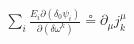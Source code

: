 \documentclass[preview]{standalone}
\begin{document}
\begin{align*}
\sum_{i} \frac{E_i \partial(\delta_{0}\psi_{i})}{\partial(\delta\omega^k)} \circeq \partial_{\mu}j^{\mu}_{k}
\end{align*}
\end{document}
